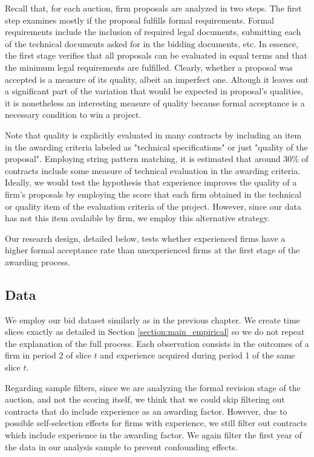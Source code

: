 Recall that, for each auction, firm proposals are analyzed in two steps. The first step examines mostly if the proposal fulfills formal requirements. Formal requirements include the inclusion of required legal documents, submitting each of the technical documents asked for in the bidding documents, etc. In essence, the first stage verifies that all proposals can be evaluated in equal terms and that the minimum legal requirements are fulfilled. Clearly, whether a proposal was accepted is a measure of its quality, albeit an imperfect one. Altough it leaves out a significant part of the variation that would be expected in proposal's qualities, it is nonetheless an interesting measure of quality because formal acceptance is a necessary condition to win a project.

Note that quality is explicitly evaluated in many contracts by including an item in the awarding criteria labeled as "technical specifications" or just "quality of the proposal". Employing string pattern matching, it is estimated that around 30\% of contracts include some measure of technical evaluation in the awarding criteria.  Ideally, we would test the hypothesis that experience improves the quality of a firm's proposals by employing the score that each firm obtained in the technical or quality item of the evaluation criteria of the project. However, since our data has not this item avalaible by firm, we employ this alternative strategy.

Our research design, detailed below, tests whether experienced firms have a higher formal acceptance rate than unexperienced firms at the first stage of the awarding process.

\subsection{Data}
We employ our bid dataset similarly as in the previous chapter. We create time slices exactly as detailed in Section \ref{section:main_empirical} so we do not repeat the explanation of the full process.  Each observation consists in the outcomes of a firm in period 2 of slice $t$ and experience acquired during period 1 of the same slice $t$.

Regarding sample filters, since we are analyzing the formal revision stage of the auction, and not the scoring itself, we think that we could skip  filtering out contracts that do include experience as an awarding factor. However, due to possible self-selection effects for firms with experience, we still filter out contracts which include experience in the awarding factor. We again filter the first year of the data in our analysis sample to prevent confounding effects.

